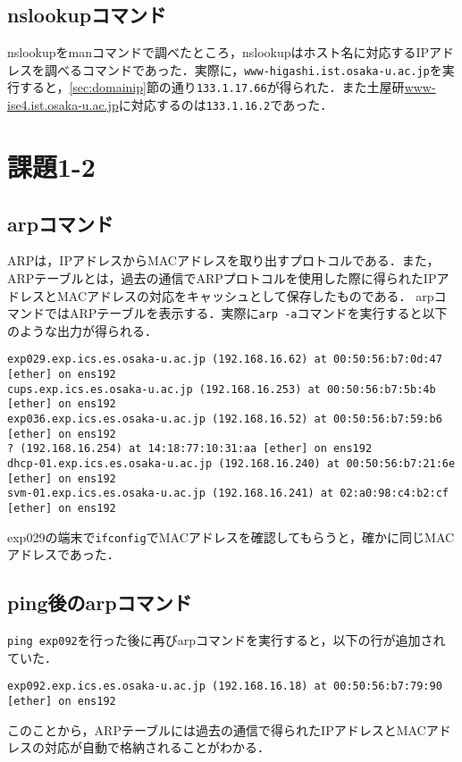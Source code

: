 \documentclass[a4j,10pt,titlepage]{jsarticle}
\begin{document}
\subsection{nslookupコマンド}\label{sec:nslookup}
nslookupをmanコマンドで調べたところ，nslookupはホスト名に対応するIPアドレスを調べるコマンドであった．実際に，\verb|www-higashi.ist.osaka-u.ac.jp|を実行すると，\ref{sec:domainip}節の通り\verb|133.1.17.66|が得られた．また土屋研\url{www-ise4.ist.osaka-u.ac.jp}に対応するのは\verb|133.1.16.2|であった．



\section{課題1-2}
\subsection{arpコマンド}
ARPは，IPアドレスからMACアドレスを取り出すプロトコルである．また，ARPテーブルとは，過去の通信でARPプロトコルを使用した際に得られたIPアドレスとMACアドレスの対応をキャッシュとして保存したものである．
arpコマンドではARPテーブルを表示する．実際に\verb|arp -a|コマンドを実行すると以下のような出力が得られる．
\begin{verbatim}
exp029.exp.ics.es.osaka-u.ac.jp (192.168.16.62) at 00:50:56:b7:0d:47 [ether] on ens192
cups.exp.ics.es.osaka-u.ac.jp (192.168.16.253) at 00:50:56:b7:5b:4b [ether] on ens192
exp036.exp.ics.es.osaka-u.ac.jp (192.168.16.52) at 00:50:56:b7:59:b6 [ether] on ens192
? (192.168.16.254) at 14:18:77:10:31:aa [ether] on ens192
dhcp-01.exp.ics.es.osaka-u.ac.jp (192.168.16.240) at 00:50:56:b7:21:6e [ether] on ens192
svm-01.exp.ics.es.osaka-u.ac.jp (192.168.16.241) at 02:a0:98:c4:b2:cf [ether] on ens192
\end{verbatim}
exp029の端末で\verb|ifconfig|でMACアドレスを確認してもらうと，確かに同じMACアドレスであった．

\subsection{ping後のarpコマンド}
\verb|ping exp092|を行った後に再びarpコマンドを実行すると，以下の行が追加されていた．
\begin{verbatim}
exp092.exp.ics.es.osaka-u.ac.jp (192.168.16.18) at 00:50:56:b7:79:90 [ether] on ens192
\end{verbatim}
このことから，ARPテーブルには過去の通信で得られたIPアドレスとMACアドレスの対応が自動で格納されることがわかる．
\end{document}
